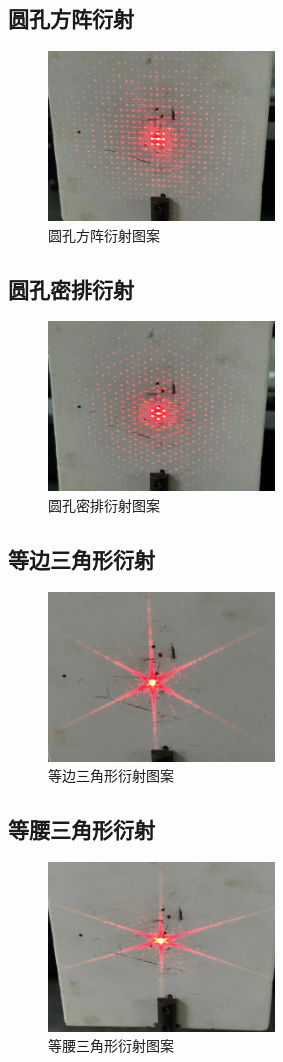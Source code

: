 \documentclass[a4paper]{ctexart}
\begin{document}
	\subsection{圆孔方阵衍射}
	\begin{figure}[H]
		\centering
		\includegraphics[width=6cm]{7.jpg}
		\caption{圆孔方阵衍射图案}
	\end{figure}
	\subsection{圆孔密排衍射}
	\begin{figure}[H]
		\centering
		\includegraphics[width=6cm]{8.jpg}
		\caption{圆孔密排衍射图案}
	\end{figure}
	\subsection{等边三角形衍射}
	\begin{figure}[H]
		\centering
		\includegraphics[width=6cm]{9.jpg}
		\caption{等边三角形衍射图案}
	\end{figure}
	\subsection{等腰三角形衍射}
	\begin{figure}[H]
		\centering
		\includegraphics[width=6cm]{0.jpg}
		\caption{等腰三角形衍射图案}
	\end{figure}
\end{document}
